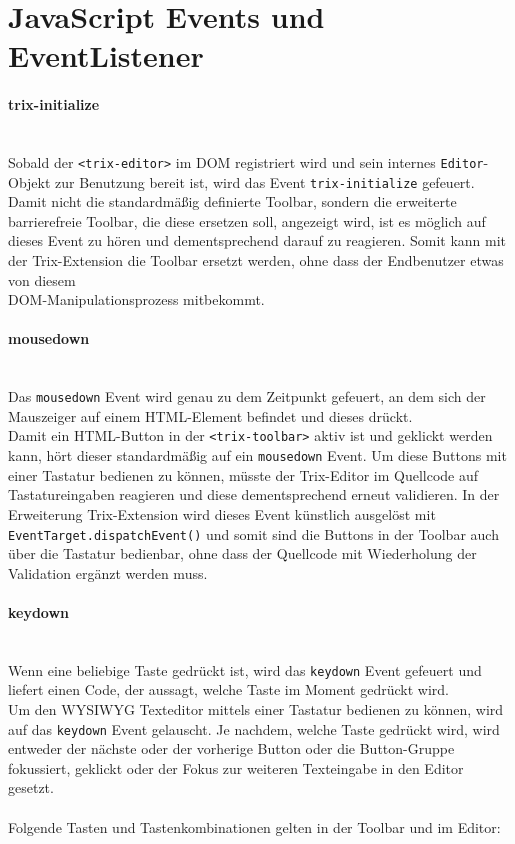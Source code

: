 \section{JavaScript Events und EventListener}
\paragraph{trix-initialize}\mbox{}\\
Sobald der \texttt{<trix-editor>} im DOM registriert wird und sein internes \texttt{Editor}-Objekt zur Benutzung bereit ist, wird das Event \texttt{trix-initialize} gefeuert.\\
Damit nicht die standardmäßig definierte Toolbar, sondern die erweiterte barrierefreie Toolbar, die diese ersetzen soll, angezeigt wird, ist es möglich auf dieses Event zu hören und dementsprechend darauf zu reagieren. Somit kann mit der Trix-Extension die Toolbar ersetzt werden, ohne dass der Endbenutzer etwas von diesem \\
DOM-Manipulationsprozess mitbekommt. %

\paragraph{mousedown}\mbox{}\\
Das \texttt{mousedown} Event wird genau zu dem Zeitpunkt gefeuert, an dem sich der Mauszeiger auf einem HTML-Element befindet und dieses drückt.\\
Damit ein HTML-Button in der \texttt{<trix-toolbar>} aktiv ist und geklickt werden kann, hört dieser standardmäßig auf ein \texttt{mousedown} Event. Um diese Buttons mit einer Tastatur bedienen zu können, müsste der Trix-Editor im Quellcode auf Tastatureingaben reagieren und diese dementsprechend erneut validieren. In der Erweiterung Trix-Extension wird dieses Event künstlich ausgelöst mit \texttt{EventTarget.dispatchEvent()} und somit sind die Buttons in der Toolbar auch über die Tastatur bedienbar, ohne dass der Quellcode mit Wiederholung der Validation ergänzt werden muss.

\paragraph{keydown}\mbox{}\\
Wenn eine beliebige Taste gedrückt ist, wird das \texttt{keydown} Event gefeuert und liefert einen Code, der aussagt, welche Taste im Moment gedrückt wird.\\
Um den WYSIWYG Texteditor mittels einer Tastatur bedienen zu können, wird auf das \texttt{keydown} Event gelauscht. Je nachdem, welche Taste gedrückt wird, wird entweder der nächste oder der vorherige Button oder die Button-Gruppe fokussiert, geklickt oder der Fokus zur weiteren Texteingabe in den Editor gesetzt.\\
\\Folgende Tasten und Tastenkombinationen gelten in der Toolbar und im Editor:

